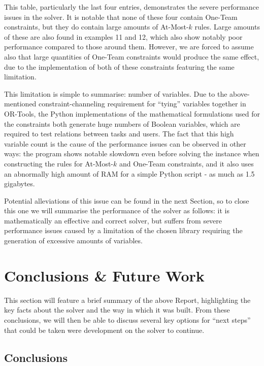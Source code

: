 \documentclass[11pt]{article}
\begin{document}
		This table, particularly the last four entries, demonstrates the severe performance issues in the solver.
		It is notable that none of these four contain One-Team constraints, but they do contain large amounts of At-Most-\(k\) rules.
		Large amounts of these are also found in examples 11 and 12, which also show notably poor performance compared to those around them.
		However, we are forced to assume also that large quantities of One-Team constraints would produce the same effect,
		due to the implementation of both of these constraints featuring the same limitation.

		This limitation is simple to summarise: number of variables. Due to the above-mentioned constraint-channeling requirement for ``tying''
		variables together in OR-Tools, the Python implementations of the mathematical formulations used for the constraints both generate huge numbers of Boolean variables,
		which are required to test relations between tasks and users.
		The fact that this high variable count is the cause of the performance issues can be observed in other ways:
		the program shows notable slowdown even before solving the instance when constructing the rules for At-Most-\(k\) and One-Team constraints,
		and it also uses an abnormally high amount of RAM for a simple Python script - as much as 1.5 gigabytes.

		Potential alleviations of this issue can be found in the next Section, so to close this one we will summarise the performance of the solver as follows:
		it is mathematically an effective and correct solver, but suffers from severe performance issues caused by a limitation of the chosen library requiring the generation of excessive amounts of variables.

	\section{Conclusions \& Future Work}

		This section will feature a brief summary of the above Report, highlighting the key facts about the solver and the way in which it was built.
		From these conclusions, we will then be able to discuss several key options for ``next steps'' that could be taken were development on the solver to continue.

		\subsection{Conclusions}
\end{document}
